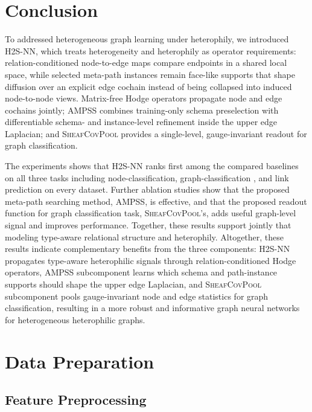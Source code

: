 \documentclass[sigconf,anonymous,review]{acmart}
\newcommand{\method}{\textsc{H2S-NN}}
\newcommand{\ampss}{\textsc{AMPSS}}
\newcommand{\sheafcovpool}{\textsc{SheafCovPool}}
\begin{document}
\section{Conclusion}

To addressed heterogeneous graph learning under heterophily, we introduced \method{}, which treats heterogeneity and heterophily as operator requirements: relation-conditioned node-to-edge maps compare endpoints in a shared local space, while selected meta-path instances remain face-like supports that shape diffusion over an explicit edge cochain instead of being collapsed into induced node-to-node views. Matrix-free Hodge operators propagate node and edge cochains jointly; \ampss{} combines training-only schema preselection with differentiable schema- and instance-level refinement inside the upper edge Laplacian; and \sheafcovpool{} provides a single-level, gauge-invariant readout for graph classification.

The experiments shows that \method{} ranks first among the compared baselines on all three tasks including node-classification, graph-classification , and link prediction on every dataset. Further ablation studies show that the proposed meta-path searching method, \ampss{},  is effective, and that the proposed readout function for graph classification task, \sheafcovpool{}'s, adds useful graph-level signal and improves performance. Together, these results support jointly that modeling type-aware relational structure and heterophily. Altogether, these results indicate complementary benefits from the three components: \method{}
propagates type-aware heterophilic signals through relation-conditioned Hodge operators, \ampss{} subcomponent
learns which schema and path-instance supports should shape the upper edge Laplacian, and
\sheafcovpool{} subcomponent pools gauge-invariant node and edge statistics for graph classification, resulting in a more robust and informative graph neural networks for heterogeneous heterophilic graphs.




\appendix

\section{Data Preparation}
\label{sec:data-prep}
\subsection{Feature Preprocessing}
\end{document}
